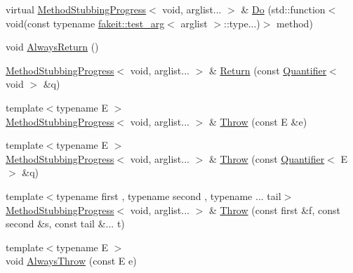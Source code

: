 \begin{DoxyCompactItemize}
virtual \mbox{\hyperlink{structfakeit_1_1MethodStubbingProgress}{Method\+Stubbing\+Progress}}$<$ void, arglist... $>$ \& \mbox{\hyperlink{structfakeit_1_1MethodStubbingProgress_3_01void_00_01arglist_8_8_8_01_4_ae41031c8833fad09c16cbbc89569918b}{Do}} (std\+::function$<$ void(const typename \mbox{\hyperlink{structfakeit_1_1test__arg}{fakeit\+::test\+\_\+arg}}$<$ arglist $>$\+::type...)$>$ method)
\item 
void \mbox{\hyperlink{structfakeit_1_1MethodStubbingProgress_3_01void_00_01arglist_8_8_8_01_4_a750cd97e361c308232871da7c336e53e}{Always\+Return}} ()
\item 
\mbox{\hyperlink{structfakeit_1_1MethodStubbingProgress}{Method\+Stubbing\+Progress}}$<$ void, arglist... $>$ \& \mbox{\hyperlink{structfakeit_1_1MethodStubbingProgress_3_01void_00_01arglist_8_8_8_01_4_afbc0d4429dddcbab63de1c88176ea0f1}{Return}} (const \mbox{\hyperlink{structfakeit_1_1Quantifier}{Quantifier}}$<$ void $>$ \&q)
\item 
{\footnotesize template$<$typename E $>$ }\\\mbox{\hyperlink{structfakeit_1_1MethodStubbingProgress}{Method\+Stubbing\+Progress}}$<$ void, arglist... $>$ \& \mbox{\hyperlink{structfakeit_1_1MethodStubbingProgress_3_01void_00_01arglist_8_8_8_01_4_a8b0d920dc6424eadd7dce7cb9df66814}{Throw}} (const E \&e)
\item 
{\footnotesize template$<$typename E $>$ }\\\mbox{\hyperlink{structfakeit_1_1MethodStubbingProgress}{Method\+Stubbing\+Progress}}$<$ void, arglist... $>$ \& \mbox{\hyperlink{structfakeit_1_1MethodStubbingProgress_3_01void_00_01arglist_8_8_8_01_4_a9eb6f25dd382ef939b775345205f42c1}{Throw}} (const \mbox{\hyperlink{structfakeit_1_1Quantifier}{Quantifier}}$<$ E $>$ \&q)
\item 
{\footnotesize template$<$typename first , typename second , typename ... tail$>$ }\\\mbox{\hyperlink{structfakeit_1_1MethodStubbingProgress}{Method\+Stubbing\+Progress}}$<$ void, arglist... $>$ \& \mbox{\hyperlink{structfakeit_1_1MethodStubbingProgress_3_01void_00_01arglist_8_8_8_01_4_a2db97b61a39cc6cecc379f6d51234c8a}{Throw}} (const first \&f, const second \&s, const tail \&... t)
\item 
{\footnotesize template$<$typename E $>$ }\\void \mbox{\hyperlink{structfakeit_1_1MethodStubbingProgress_3_01void_00_01arglist_8_8_8_01_4_ad42a19c184f5efba2f997b30f57b9a24}{Always\+Throw}} (const E e)
\item 

\end{DoxyCompactItemize}
